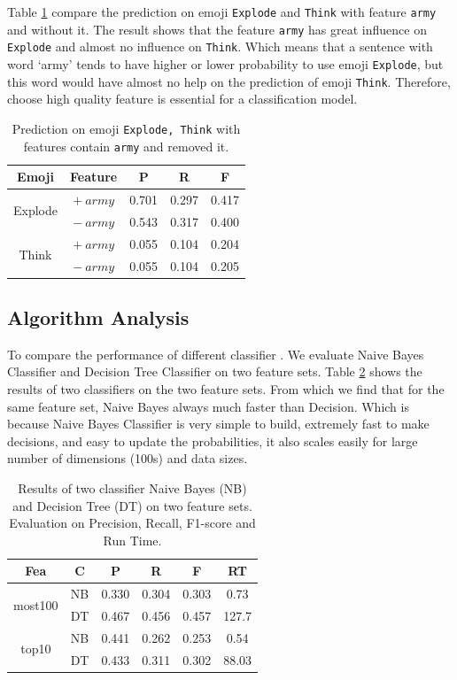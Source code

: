 \documentclass[11pt]{article}
\begin{document}
Table \ref{tab:2} compare the prediction on emoji \texttt{Explode} and \texttt{Think} with feature \texttt{army} and without it. The result shows that the feature \texttt{army} has great influence on \texttt{Explode} and almost no influence on \texttt{Think}. Which means that a sentence with word `army' tends to have higher or lower probability to use emoji \texttt{Explode},  but this word would have almost no help on the prediction of emoji \texttt{Think}. Therefore, choose high quality feature is essential for a classification model.
\begin{table}[h]
	\centering
	\begin{tabular}{c|c|ccc}
		\hline
		\textbf{Emoji} & \textbf{Feature} & \textbf{P} & \textbf{R} & \textbf{F}  \\
		\hline
		\multirow{2}{*}{Explode} & $+\ army$ & 0.701   &   0.297   & 0.417 \\
		& $-\ army$ & 0.543    &  0.317   & 0.400 \\
		\hline
		\multirow{2}{*}{Think} & $+\ army$ & 0.055  &  0.104   &   0.204 \\
		& $-\ army$ & 0.055 &   0.104    &  0.205 \\
		\hline
	\end{tabular}
	\caption{Prediction on emoji \texttt{Explode, Think} with features contain \texttt{army} and removed it.}
	\label{tab:2}
\end{table}

\subsection{Algorithm Analysis}

To compare the performance of different classifier . We evaluate Naive Bayes Classifier and Decision Tree Classifier on two feature sets. Table \ref{tab:4} shows the results of two classifiers on the two feature sets. From which we find that for the same feature set, Naive Bayes always much faster than Decision. Which is because Naive Bayes Classifier is very simple to build, extremely fast to make decisions, and easy to update the probabilities, it also scales easily for large number of dimensions (100s) and data sizes. 

\begin{table}[h]
	\centering
	\begin{tabular}{c|c|ccc|c}
		\hline
		\textbf{Fea} & \textbf{C} & \textbf{P} & \textbf{R} & \textbf{F} & \textbf{RT}\\
		\hline
		\multirow{2}{*}{most100} & NB & 0.330   &   0.304  &  0.303  &  0.73 \\
		& DT & 0.467  &    0.456   & 0.457  & 127.7 \\
		\hline
		\multirow{2}{*}{top10} & NB &0.441  &    0.262  &  0.253  &  0.54 \\
		&	DT & 0.433   &   0.311  &  0.302  & 88.03  \\
		\hline
	\end{tabular}
	\caption{Results of two classifier Naive Bayes (NB) and Decision Tree (DT) on two feature sets. Evaluation on Precision, Recall, F1-score and Run Time.}
	\label{tab:4}
\end{table}
\end{document}

